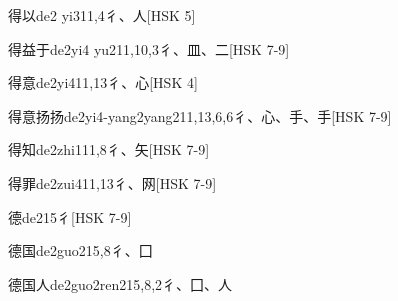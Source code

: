 \begin{EntryWithPhonetic}{得以}{de2 yi3}{11,4}{⼻、⼈}[HSK 5]
\end{EntryWithPhonetic}

\begin{EntryWithPhonetic}{得益于}{de2yi4 yu2}{11,10,3}{⼻、⽫、⼆}[HSK 7-9]
\end{EntryWithPhonetic}

\begin{EntryWithPhonetic}{得意}{de2yi4}{11,13}{⼻、⼼}[HSK 4]
\end{EntryWithPhonetic}

\begin{EntryWithPhonetic}{得意扬扬}{de2yi4-yang2yang2}{11,13,6,6}{⼻、⼼、⼿、⼿}[HSK 7-9]
\end{EntryWithPhonetic}

\begin{EntryWithPhonetic}{得知}{de2zhi1}{11,8}{⼻、⽮}[HSK 7-9]
\end{EntryWithPhonetic}

\begin{EntryWithPhonetic}{得罪}{de2zui4}{11,13}{⼻、⽹}[HSK 7-9]
\end{EntryWithPhonetic}

\begin{EntryWithPhonetic}{德}{de2}{15}{⼻}[HSK 7-9]
\end{EntryWithPhonetic}

\begin{EntryWithPhonetic}{德国}{de2guo2}{15,8}{⼻、⼞}
\end{EntryWithPhonetic}

\begin{EntryWithPhonetic}{德国人}{de2guo2ren2}{15,8,2}{⼻、⼞、⼈}
\end{EntryWithPhonetic}

